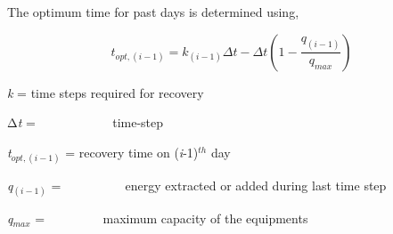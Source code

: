 The optimum time for past days is determined using,

\begin{equation}
{t_{opt,\left( {i - 1} \right)}} = {k_{\left( {i - 1} \right)}}\Delta t - \Delta t\left( {1 - \frac{{{q_{\left( {i - 1} \right)}}}}{{{q_{max}}}}} \right)
\end{equation}

\emph{k} = time steps required for recovery

Δ\emph{t} = ~~~~~~~~~~~ time-step

\emph{t\(_{opt,(i-1)}\)} = recovery time on (\emph{i}-1)\(^{th}\) day

\emph{q\(_{(i-1)}\)} = ~~~~~~~~~ energy extracted or added during last time step

\emph{q\(_{max}\)} = ~~~~~~~~ maximum capacity of the equipments 
